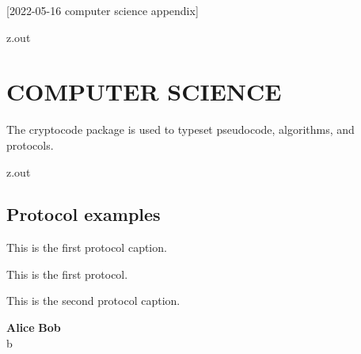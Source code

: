 [2022-05-16 computer science appendix]

\begin{VerbatimOut}{z.out}
\chapter{COMPUTER SCIENCE}

The cryptocode package
\cite{mittelbach2020}
%
is used to typeset pseudocode,
algorithms,
and protocols.
\end{VerbatimOut}

\MyIO


\begin{VerbatimOut}{z.out}


\section{Protocol examples}

\begin{protocol}[ht]
  \caption{This is the first protocol caption.}
  This is the first protocol.
\end{protocol}

\begin{protocol}[ht]
  \caption{This is the second protocol caption.}
  \pseudocodeblock
  {
    \textbf{Alice} \> \> \textbf{Bob}\\
    b \sample \bin \> \>\\
    \>  \> \\
    \> \> 
  }
\end{protocol}
\end{VerbatimOut}

\MyIO
